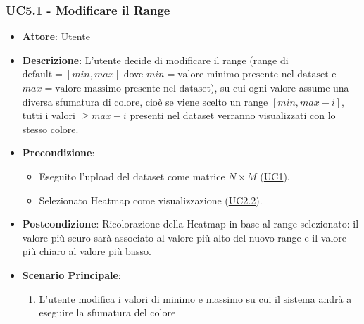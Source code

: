     \subsubsection{UC5.1 - Modificare il Range}
    \label{uc5.1}
    \begin{itemize}
    \item \textbf{Attore}: Utente
    \item \textbf{Descrizione}: L'utente decide di modificare il range (range di $\textrm{default}=[min, max]$ dove $min=\textrm{valore minimo presente nel dataset}$ e $max=\textrm{valore massimo presente nel dataset}$), su cui ogni valore assume una diversa sfumatura di colore, cioè se viene scelto un range $[min, max-i]$, tutti i valori $\geq max-i$ presenti nel dataset verranno visualizzati con lo stesso colore.
    \item \textbf{Precondizione}: 
    \begin{itemize}
        \item Eseguito l'upload del dataset come matrice $N\times M$ (\hyperref[uc1]{UC1}).
        \item Selezionato Heatmap come visualizzazione (\hyperref[uc2.2]{UC2.2}).
    \end{itemize}  
    \item \textbf{Postcondizione}: Ricolorazione della Heatmap in base al range selezionato: il valore più scuro sarà associato al valore più alto del nuovo range e il valore più chiaro al valore più basso.
    \item \textbf{Scenario Principale}: 
    \begin{enumerate}
        \item L'utente modifica i valori di minimo e massimo su cui il sistema andrà a eseguire la sfumatura del colore
    \end{enumerate}  
    \end{itemize}
    
    
